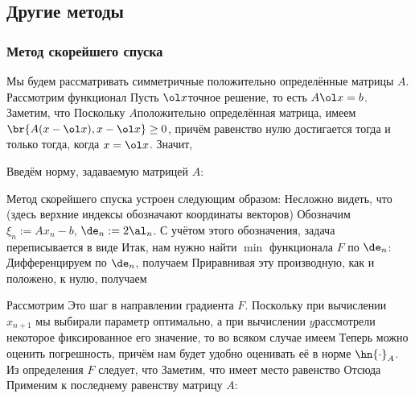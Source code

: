 \documentclass[a4paper]{article}
\begin{document}
\subsection{Другие методы}

\subsubsection{Метод скорейшего спуска}

Мы будем рассматривать симметричные положительно определённые матрицы $A$.
Рассмотрим функционал
Пусть $\ol x$\т точное решение, то есть $A\ol x = b$. Заметим, что
Поскольку $A$\т положительно определённая матрица, имеем $\br{A(x - \ol x), x - \ol x} \ge 0$,
причём равенство нулю достигается тогда и только тогда, когда $x = \ol x$.
Значит,

Введём норму, задаваемую матрицей $A$:

Метод скорейшего спуска устроен следующим образом:
Несложно видеть, что (здесь верхние индексы обозначают координаты векторов)
Обозначим $\xi_n := Ax_n - b$, $\de_n := 2\al_n$.
С учётом этого обозначения, задача переписывается в виде
Итак, нам нужно найти $\min$ функционала $F$ по $\de_n$:
Дифференцируем по $\de_n$, получаем
Приравнивая эту производную, как и положено, к нулю, получаем

Рассмотрим
Это шаг в направлении градиента $F$. Поскольку при вычислении $x_{n+1}$
мы выбирали параметр оптимально, а при вычислении $y$\т рассмотрели некоторое фиксированное его значение,
то во всяком случае имеем
Теперь можно оценить погрешность, причём нам будет удобно оценивать её в норме $\hn{\cdot}_A$.
Из определения $F$ следует, что
Заметим, что имеет место равенство
Отсюда
Применим к последнему равенству матрицу $A$:
\end{document}
